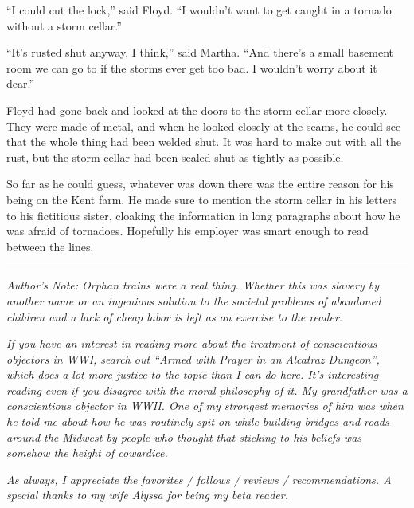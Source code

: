 ``I could cut the lock,'' said Floyd. ``I wouldn't want to get caught in
a tornado without a storm cellar.''

``It's rusted shut anyway, I think,'' said Martha. ``And there's a small
basement room we can go to if the storms ever get too bad. I wouldn't
worry about it dear.''

Floyd had gone back and looked at the doors to the storm cellar more
closely. They were made of metal, and when he looked closely at the
seams, he could see that the whole thing had been welded shut. It was
hard to make out with all the rust, but the storm cellar had been sealed
shut as tightly as possible.

So far as he could guess, whatever was down there was the entire reason
for his being on the Kent farm. He made sure to mention the storm cellar
in his letters to his fictitious sister, cloaking the information in
long paragraphs about how he was afraid of tornadoes. Hopefully his
employer was smart enough to read between the lines.

\begin{center}\rule{0.5\linewidth}{\linethickness}\end{center}

\emph{Author's Note: Orphan trains were a real thing. Whether this was
slavery by another name or an ingenious solution to the societal
problems of abandoned children and a lack of cheap labor is left as an
exercise to the reader.}

\emph{If you have an interest in reading more about the treatment of
conscientious objectors in WWI, search out ``Armed with Prayer in an
Alcatraz Dungeon'', which does a lot more justice to the topic than I
can do here. It's interesting reading even if you disagree with the
moral philosophy of it. My grandfather was a conscientious objector in
WWII. One of my strongest memories of him was when he told me about how
he was routinely spit on while building bridges and roads around the
Midwest by people who thought that sticking to his beliefs was somehow
the height of cowardice.}

\emph{As always, I appreciate the favorites / follows / reviews /
recommendations. A special thanks to my wife Alyssa for being my beta
reader.}

